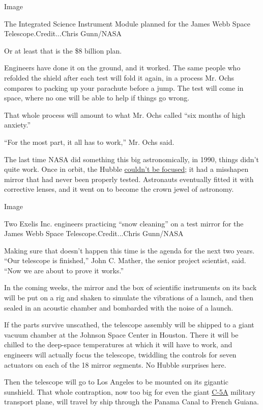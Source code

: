Image

The Integrated Science Instrument Module planned for the James Webb
Space Telescope.Credit...Chris Gunn/NASA

Or at least that is the \$8 billion plan.

Engineers have done it on the ground, and it worked. The same people who
refolded the shield after each test will fold it again, in a process Mr.
Ochs compares to packing up your parachute before a jump. The test will
come in space, where no one will be able to help if things go wrong.

That whole process will amount to what Mr. Ochs called ``six months of
high anxiety.''

``For the most part, it all has to work,'' Mr. Ochs said.

The last time NASA did something this big astronomically, in 1990,
things didn't quite work. Once in orbit, the Hubble
\href{http://www.nytimes3xbfgragh.onion/1990/10/27/us/nasa-weighs-mission-to-correct-space-telescope-s-blurred-vision.html}{couldn't
be focused}; it had a misshapen mirror that had never been properly
tested. Astronauts eventually fitted it with corrective lenses, and it
went on to become the crown jewel of astronomy.

Image

Two Exelis Inc. engineers practicing ``snow cleaning'' on a test mirror
for the James Webb Space Telescope.Credit...Chris Gunn/NASA

Making sure that doesn't happen this time is the agenda for the next two
years. ``Our telescope is finished,'' John C. Mather, the senior project
scientist, said. ``Now we are about to prove it works.''

In the coming weeks, the mirror and the box of scientific instruments on
its back will be put on a rig and shaken to simulate the vibrations of a
launch, and then sealed in an acoustic chamber and bombarded with the
noise of a launch.

If the parts survive unscathed, the telescope assembly will be shipped
to a giant vacuum chamber at the Johnson Space Center in Houston. There
it will be chilled to the deep-space temperatures at which it will have
to work, and engineers will actually focus the telescope, twiddling the
controls for seven actuators on each of the 18 mirror segments. No
Hubble surprises here.

Then the telescope will go to Los Angeles to be mounted on its gigantic
sunshield. That whole contraption, now too big for even the giant
\href{http://www.af.mil/AboutUs/FactSheets/Display/tabid/224/Article/104492/c-5-abc-galaxy-c-5m-super-galaxy.aspx}{C-5A}
military transport plane, will travel by ship through the Panama Canal
to French Guiana.

